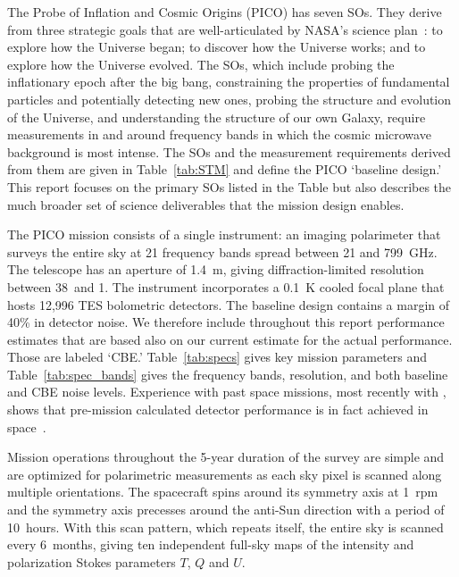 \documentclass[PICOReport.tex]{subfiles}
\begin{document}
 
 
The Probe of Inflation and Cosmic Origins (PICO) has seven \ac{SOs}. They derive from three strategic goals that are well-articulated by NASA's science plan~\citep{latest_nasa_science_plan,latest_nasa_strategic_plan}: to explore how the Universe began; to discover how the Universe works; and to explore how the Universe evolved. The \ac{SOs}, which include probing the inflationary epoch after the big bang, constraining the properties of fundamental particles and potentially detecting new ones, probing the structure and evolution of the Universe, and understanding the structure of our own Galaxy, require measurements in and around frequency bands in which the cosmic microwave background is most intense. The \ac{SOs} and the measurement requirements derived from them are given in Table~\ref{tab:STM} and define the PICO `baseline design.' 
This report focuses on the primary \ac{SOs} listed in the Table but also describes the much broader set of science deliverables that the mission design enables.

The PICO mission consists of a single instrument: an imaging polarimeter that surveys the entire sky at 21 frequency bands spread between 21 and 799~GHz.  The telescope has an aperture of 1.4~m, giving diffraction-limited resolution between 38\arcmin\ and 1\arcmin . The instrument incorporates a 0.1~K cooled focal plane that hosts 12,996 \ac{TES} bolometric detectors. The baseline design contains a margin of 40\% in detector noise. We therefore include throughout this report performance estimates that are based also on our current estimate for the actual performance. Those are labeled `\ac{CBE}.' Table~\ref{tab:specs} gives key mission parameters and Table~\ref{tab:spec_bands} gives the frequency bands, resolution, and both baseline and \ac{CBE} noise levels. Experience with past space missions, most recently with \planck , shows that pre-mission calculated detector performance is in fact achieved in space~\citep{planck1101.2038,planck1101.2039,Jarosik}.

Mission operations throughout the 5-year duration of the survey are simple and are optimized for polarimetric measurements as each sky pixel is scanned along multiple orientations. The spacecraft spins around its symmetry axis at 1~rpm and the symmetry axis precesses around the anti-Sun direction with a period of 10~hours. With this scan pattern, which repeats itself, the entire sky is scanned every 6~months, giving ten independent full-sky maps of the intensity and polarization Stokes parameters $T$, $Q$ and $U$.  
\end{document}
